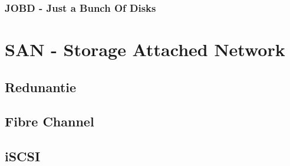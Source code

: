 \documentclass[a4paper,12pt,twoside,openright,titlepage]{book}
\begin{document}
\subsection{JOBD - Just a Bunch Of Disks}


\chapter{SAN - Storage Attached Network}

\section{Redunantie}

\section{Fibre Channel}

\section{iSCSI}


\printindex
\end{document}
